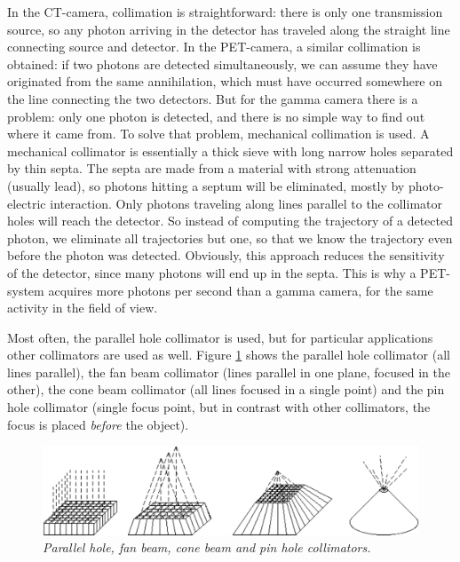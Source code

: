 In the CT-camera, collimation is straightforward: there is only one
transmission source, so any photon arriving in the detector has traveled along
the straight line connecting source and detector. In the PET-camera, a similar
collimation is obtained: if two photons are detected simultaneously, we can
assume they have originated from the same annihilation, which must have
occurred somewhere on the line connecting the two detectors. But for the gamma
camera there is a problem: only one photon is detected, and there is no simple
way to find out where it came from. To solve that problem, mechanical
collimation is used. A mechanical collimator is essentially a thick sieve with
long narrow holes separated by thin septa. The septa are made from a material
with strong attenuation (usually lead), so photons hitting a septum will be
eliminated, mostly by photo-electric interaction. Only photons traveling along
lines parallel to the collimator holes will reach the detector. So instead of
computing the trajectory of a detected photon, we eliminate all trajectories
but one, so that we know the trajectory even before the photon was detected.
Obviously, this approach reduces the sensitivity of the detector, since many
photons will end up in the septa. This is why a PET-system acquires more
photons per second than a gamma camera, for the same activity in the field of
view.

Most often, the parallel hole collimator is used, but for particular
applications other collimators are used as well. Figure \ref{fig:collimators}
shows the parallel hole collimator (all lines parallel), the fan beam
collimator (lines parallel in one plane, focused in the other), the cone beam
collimator (all lines focused in a single point) and the pin hole collimator
(single focus point, but in contrast with other collimators, the focus is
placed {\em before} the object).

\begin{figure}[tb]
\centering
\includegraphics[width=1.2\figone]{figs/fig_collimators.pdf}
\caption{\label{fig:collimators} \emph{Parallel hole, fan beam, cone beam and
pin hole collimators.}}
\end{figure}

